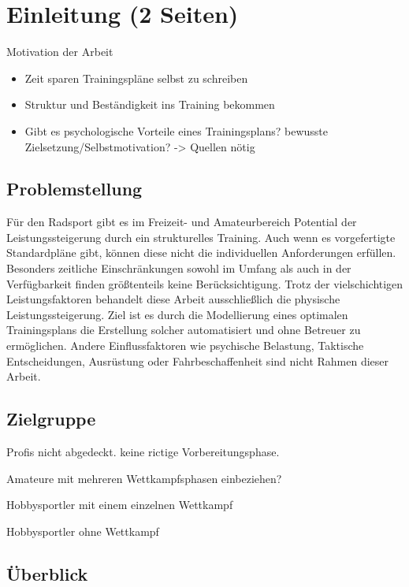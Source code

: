 \chapter{Einleitung (2 Seiten)}
\label{sec:einleitung}
Motivation der Arbeit
\begin{itemize}
    \item Zeit sparen Trainingspläne selbst zu schreiben
    \item Struktur und Beständigkeit ins Training bekommen 
    \item Gibt es psychologische Vorteile eines Trainingsplans? bewusste Zielsetzung/Selbstmotivation? -> Quellen nötig
\end{itemize}


\section{Problemstellung}
\label{sec:einleitung:problem}
Für den Radsport gibt es im Freizeit- und Amateurbereich Potential der Leistungssteigerung durch ein strukturelles Training. Auch wenn es vorgefertigte Standardpläne gibt, können diese nicht die individuellen Anforderungen erfüllen. Besonders zeitliche Einschränkungen sowohl im Umfang als auch in der Verfügbarkeit finden größtenteils keine Berücksichtigung.
Trotz der vielschichtigen Leistungsfaktoren behandelt diese Arbeit ausschließlich die physische Leistungssteigerung. Ziel ist es durch die Modellierung eines optimalen Trainingsplans die Erstellung solcher automatisiert und ohne Betreuer zu ermöglichen. 
Andere Einflussfaktoren wie psychische Belastung, Taktische Entscheidungen,  Ausrüstung oder Fahrbeschaffenheit \cite[13-15]{Radsporttraining} sind nicht Rahmen dieser Arbeit.

\section{Zielgruppe}
Profis nicht abgedeckt. keine rictige Vorbereitungsphase.

Amateure mit mehreren Wettkampfsphasen einbeziehen?

Hobbysportler mit einem einzelnen Wettkampf 

Hobbysportler ohne Wettkampf

\section{Überblick}
\label{sec:intro:ueberblick}
\textbf{} \\[0.2em]

